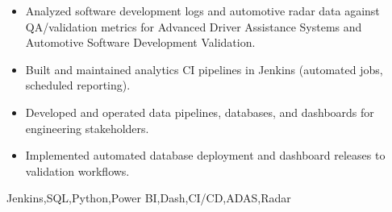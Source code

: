 \begin{experiences}
{\begin{itemize}
                          \item Analyzed software development logs and automotive radar data against QA/validation metrics for Advanced Driver Assistance Systems and Automotive Software Development Validation.
                          \item Built and maintained analytics CI pipelines in Jenkins (automated jobs, scheduled reporting).
                          \item Developed and operated data pipelines, databases, and dashboards for engineering stakeholders.
                          \item Implemented automated database deployment and dashboard releases to validation workflows.
                      \end{itemize}
                  }
                  {Jenkins,SQL,Python,Power BI,Dash,CI/CD,ADAS,Radar}
\end{experiences} 
